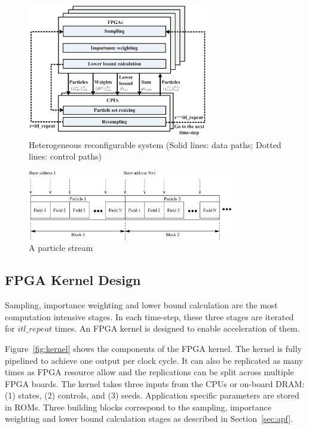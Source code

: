 \begin{figure}[t!]
\centering
\includegraphics[width=0.7\textwidth]{runtime_reconfiguration/figures/fig_arch}
\caption{Heterogeneous reconfigurable system (Solid lines: data paths; Dotted lines: control paths)}
\label{fig:arch}
\end{figure}

\begin{figure}[t!]
\centering
\includegraphics[width=0.8\textwidth]{runtime_reconfiguration/figures/fig_particles}
\caption{A particle stream}
\label{fig:particles_stream}
\end{figure}

\subsection{FPGA Kernel Design}
Sampling, importance weighting and lower bound calculation are the most computation intensive stages.
In each time-step, these three stages are iterated for $itl\_repeat$ times.
An FPGA kernel is designed to enable acceleration of them.

Figure~\ref{fig:kernel} shows the components of the FPGA kernel.
The kernel is fully pipelined to achieve one output per clock cycle.
It can also be replicated as many times as FPGA resource allow and the replications can be split across multiple FPGA boards.
The kernel takes three inputs from the CPUs or on-board DRAM: (1) states, (2) controls, and (3) seeds.
Application specific parameters are stored in ROMs.
Three building blocks correspond to the sampling, importance weighting and lower bound calculation stages as described in Section~\ref{sec:apf}.

